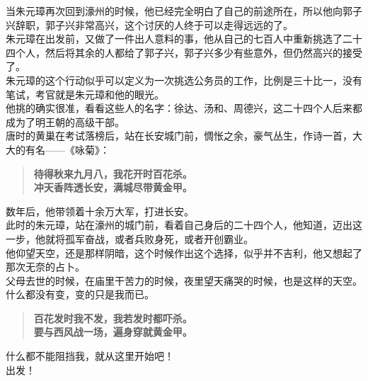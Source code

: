\begin{multicols}{\theparacolNo}
当朱元璋再次回到濠州的时候，他已经完全明白了自己的前途所在，所以他向郭子兴辞职，郭子兴非常高兴，这个讨厌的人终于可以走得远远的了。\\

朱元璋在出发前，又做了一件出人意料的事，他从自己的七百人中重新挑选了二十四个人，然后将其余的人都给了郭子兴，郭子兴多少有些意外，但仍然高兴的接受了。\\

朱元璋的这个行动似乎可以定义为一次挑选公务员的工作，比例是三十比一，没有笔试，考官就是朱元璋和他的眼光。\\

他挑的确实很准，看看这些人的名字：徐达、汤和、周德兴，这二十四个人后来都成为了明王朝的高级干部。\\

唐时的黄巢在考试落榜后，站在长安城门前，惆怅之余，豪气丛生，作诗一首，大大的有名——《咏菊》：
	\begin{quote}
	\textbf{
		\textsf{
			待得秋来九月八，我花开时百花杀。\\
			冲天香阵透长安，满城尽带黄金甲。\\}}
	\end{quote}
数年后，他带领着十余万大军，打进长安。\\

此时的朱元璋，站在濠州的城门前，看着自己身后的二十四个人，他知道，迈出这一步，他就将孤军奋战，或者兵败身死，或者开创霸业。\\

他仰望天空，还是那样阴暗，这个时候作出这个选择，似乎并不吉利，他又想起了那次无奈的占卜。\\

父母去世的时候，在庙里干苦力的时候，夜里望天痛哭的时候，也是这样的天空。\\

什么都没有变，变的只是我而已。
	\begin{quote}
	\textbf{
		\textsf{
			百花发时我不发，我若发时都吓杀。\\
			要与西风战一场，遍身穿就黄金甲。\\}}
	\end{quote}
什么都不能阻挡我，就从这里开始吧！\\

出发！\\
\ifnum{}
	\end{multicols}
\fi
\newpage
